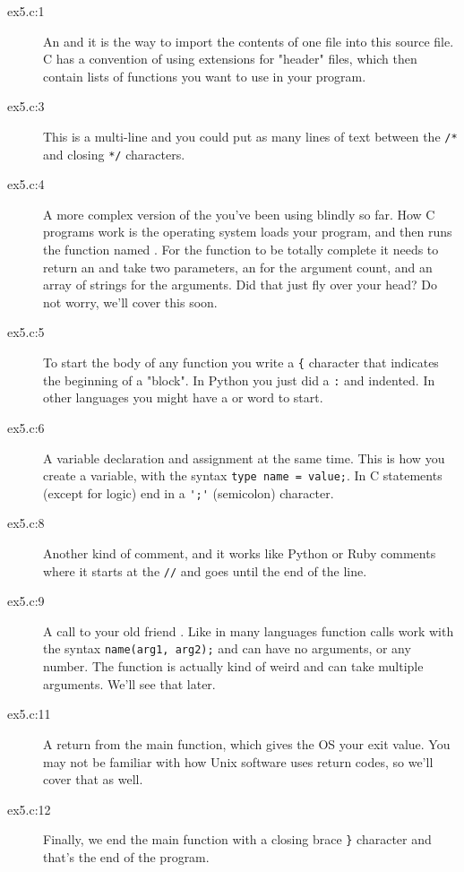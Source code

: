 \begin{description}
\item[ex5.c:1] An  and it is the way to import the contents
    of one file into this source file.  C has a convention of using 
     extensions for "header" files, which then contain lists
    of functions you want to use in your program.
\item[ex5.c:3] This is a multi-line  and you could put as many
    lines of text between the \verb|/*| and closing \verb|*/| characters.
\item[ex5.c:4] A more complex version of the  you've
    been using blindly so far.  How C programs work is the operating system
    loads your program, and then runs the function named .
    For the function to be totally complete it needs to return an 
    and take two parameters, an  for the argument count, and
    an array of  strings for the arguments.  Did that
    just fly over your head?  Do not worry, we'll cover this soon.
\item[ex5.c:5] To start the body of any function you write a \verb|{| character
    that indicates the beginning of a "block".  In Python you just
    did a \verb|:| and indented. In other languages you might have a
     or  word to start.
\item[ex5.c:6] A variable declaration and assignment at the same time.
    This is how you create a variable, with the syntax \verb|type name = value;|.
    In C statements (except for logic) end in a \verb|';'| (semicolon) character.
\item[ex5.c:8] Another kind of comment, and it works like Python or
    Ruby comments where it starts at the \verb|//| and goes until the end of
    the line.
\item[ex5.c:9] A call to your old friend .  Like in many languages
    function calls work with the syntax \verb|name(arg1, arg2);| and can have
    no arguments, or any number.  The  function is actually
    kind of weird and can take multiple arguments. We'll see that later.
\item[ex5.c:11] A return from the main function, which gives the OS your exit
    value.  You may not be familiar with how Unix software uses return
    codes, so we'll cover that as well.
\item[ex5.c:12] Finally, we end the main function with a closing brace \verb|}|
    character and that's the end of the program.
\end{description}

